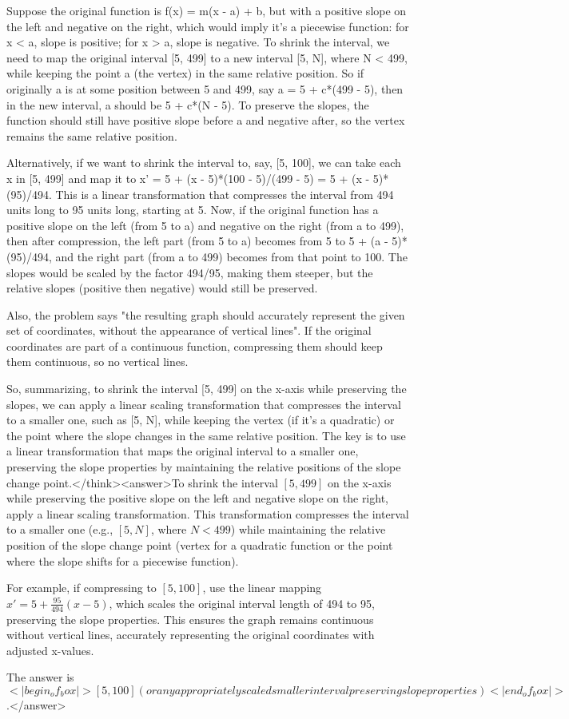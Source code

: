 Suppose the original function is f(x) = m(x - a) + b, but with a positive slope on the left and negative on the right, which would imply it's a piecewise function: for x < a, slope is positive; for x > a, slope is negative. To shrink the interval, we need to map the original interval [5, 499] to a new interval [5, N], where N < 499, while keeping the point a (the vertex) in the same relative position. So if originally a is at some position between 5 and 499, say a = 5 + c*(499 - 5), then in the new interval, a should be 5 + c*(N - 5). To preserve the slopes, the function should still have positive slope before a and negative after, so the vertex remains the same relative position. 

Alternatively, if we want to shrink the interval to, say, [5, 100], we can take each x in [5, 499] and map it to x' = 5 + (x - 5)*(100 - 5)/(499 - 5) = 5 + (x - 5)*(95)/494. This is a linear transformation that compresses the interval from 494 units long to 95 units long, starting at 5. Now, if the original function has a positive slope on the left (from 5 to a) and negative on the right (from a to 499), then after compression, the left part (from 5 to a) becomes from 5 to 5 + (a - 5)*(95)/494, and the right part (from a to 499) becomes from that point to 100. The slopes would be scaled by the factor 494/95, making them steeper, but the relative slopes (positive then negative) would still be preserved. 

Also, the problem says "the resulting graph should accurately represent the given set of coordinates, without the appearance of vertical lines". If the original coordinates are part of a continuous function, compressing them should keep them continuous, so no vertical lines. 

So, summarizing, to shrink the interval [5, 499] on the x-axis while preserving the slopes, we can apply a linear scaling transformation that compresses the interval to a smaller one, such as [5, N], while keeping the vertex (if it's a quadratic) or the point where the slope changes in the same relative position. The key is to use a linear transformation that maps the original interval to a smaller one, preserving the slope properties by maintaining the relative positions of the slope change point.</think><answer>To shrink the interval \([5, 499]\) on the x-axis while preserving the positive slope on the left and negative slope on the right, apply a linear scaling transformation. This transformation compresses the interval to a smaller one (e.g., \([5, N]\), where \(N < 499\)) while maintaining the relative position of the slope change point (vertex for a quadratic function or the point where the slope shifts for a piecewise function). 

For example, if compressing to \([5, 100]\), use the linear mapping \(x' = 5 + \frac{95}{494}(x - 5)\), which scales the original interval length of 494 to 95, preserving the slope properties. This ensures the graph remains continuous without vertical lines, accurately representing the original coordinates with adjusted x-values.

The answer is \(<|begin_of_box|>[5, 100] (or any appropriately scaled smaller interval preserving slope properties)<|end_of_box|>\).</answer>